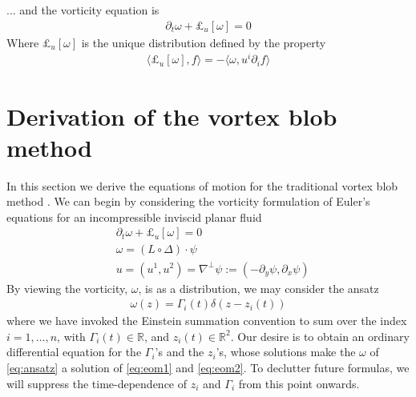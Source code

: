 \documentclass[12pt]{amsart}
\begin{document}
... and the vorticity equation is
\begin{align*}
  \partial_t \omega + \pounds_u [\omega] = 0
\end{align*}
Where $\pounds_u[\omega]$ is the unique distribution defined by the property
\begin{align*}
  \langle \pounds_u[\omega] , f \rangle = - \langle \omega , u^i \partial_i f \rangle
\end{align*}


\section{Derivation of the vortex blob method}
\label{sec:vortex_blob}
In this section we derive the equations of motion for the traditional
vortex blob method .
We can begin by considering the vorticity formulation of Euler's equations for an incompressible inviscid planar fluid
\begin{align}
  &\partial_t \omega + \pounds_u[ \omega] = 0 \label{eq:eom1} \\
  &\omega = (L \circ \Delta) \cdot \psi \label{eq:eom2} \\
  &u = (u^1,u^2) = \nabla^\perp \psi :=  (- \partial_y \psi, \partial_x \psi)
  \label{eq:eom3}
\end{align}
By viewing the vorticity, $\omega$, is as a distribution,
we may consider the ansatz
\begin{align}
  \omega(z) = \Gamma_i(t) \delta(z-z_i(t))
  \label{eq:ansatz}
\end{align} 
where we have invoked the Einstein summation convention to sum over 
the index $i=1,\dots,n$,
with $\Gamma_i(t) \in \mathbb{R}$,
and $z_i(t) \in \mathbb{R}^2$.
Our desire is to obtain an ordinary differential equation for the $\Gamma_i$'s and the $z_i$'s,
whose solutions make the $\omega$ of \eqref{eq:ansatz} a solution of \eqref{eq:eom1} and \eqref{eq:eom2}.
To declutter future formulas,
we will suppress the time-dependence of $z_i$ and $\Gamma_i$
from this point onwards.
\end{document}
